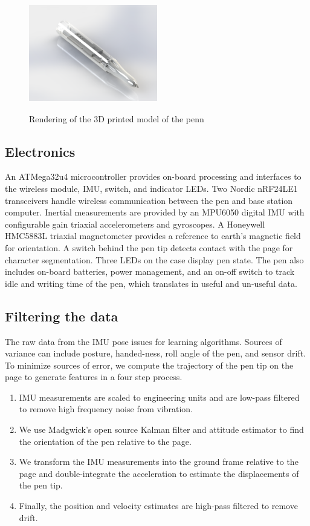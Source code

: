 \documentclass{article}
\begin{document}
\begin{figure}[H]
	\centering
	\includegraphics[width=0.5\textwidth, height= 5cm]{pen_render.png}
	\caption{Rendering of the 3D printed model of the penn}
\end{figure}

\subsection{Electronics}
An ATMega32u4 microcontroller provides on-board processing and interfaces to the wireless module, IMU, switch, and indicator LEDs. Two Nordic nRF24LE1 transceivers handle wireless communication between the pen and base station computer. Inertial measurements are provided by an MPU6050 digital IMU with configurable gain triaxial accelerometers and gyroscopes. A Honeywell HMC5883L triaxial magnetometer provides a reference to earth's magnetic field for orientation. A switch behind the pen tip detects contact with the page for character segmentation. Three LEDs on the case display pen state. The pen also includes on-board batteries, power management, and an on-off switch to track idle and writing time of the pen, which translates in useful and un-useful data.

\subsection{Filtering the data}

The raw data from the IMU pose issues for learning algorithms. Sources of variance can include posture, handed-ness, roll angle of the pen, and sensor drift. To minimize sources of error, we compute the trajectory of the pen tip on the page to generate features in a four step process. 
\begin{enumerate}
  \item IMU measurements are scaled to engineering units and are low-pass filtered to remove high frequency noise from vibration.
  \item We use Madgwick's open source Kalman filter and attitude estimator to find the orientation of the pen relative to the page.
  \item We transform the IMU measurements into the ground frame relative to the page and double-integrate the acceleration to estimate the displacements of the pen tip.
  \item Finally, the position and velocity estimates are high-pass filtered to remove drift.
\end{enumerate}
\end{document}
